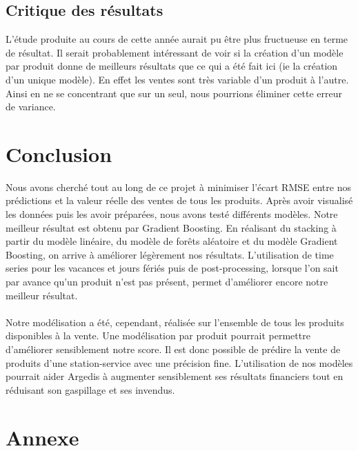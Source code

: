 \documentclass{article} %
\begin{document}
\subsection{Critique des résultats}
L'étude produite au cours de cette année aurait pu être plus fructueuse en terme de résultat. Il serait probablement intéressant de voir si la création d'un modèle par produit donne de meilleurs résultats que ce qui a été fait ici (ie la création d'un unique modèle). En effet les ventes sont très variable d'un produit à l'autre. Ainsi en ne se concentrant que sur un seul, nous pourrions éliminer cette erreur de variance.

\section{Conclusion}
Nous avons cherché tout au long de ce projet à minimiser l’écart RMSE entre nos prédictions et la valeur réelle des ventes de tous les produits. Après avoir visualisé les données puis les avoir préparées, nous avons testé différents modèles. Notre meilleur résultat est obtenu par Gradient Boosting. En réalisant du stacking à partir du modèle linéaire, du modèle de forêts aléatoire et du modèle Gradient Boosting, on arrive à améliorer légèrement nos résultats. L’utilisation de time series pour les vacances et jours fériés puis de post-processing, lorsque l’on sait par avance qu’un produit n’est pas présent, permet d’améliorer encore notre meilleur résultat.\\\\

Notre modélisation a été, cependant, réalisée sur l’ensemble de tous les produits disponibles à la vente. Une modélisation par produit pourrait permettre d’améliorer sensiblement notre score.
Il est donc possible de prédire la vente de produits d’une station-service avec une précision fine. L’utilisation de nos modèles pourrait aider Argedis à augmenter sensiblement ses résultats financiers tout en réduisant son gaspillage et ses invendus.

\newpage
\section{Annexe}
\end{document}
